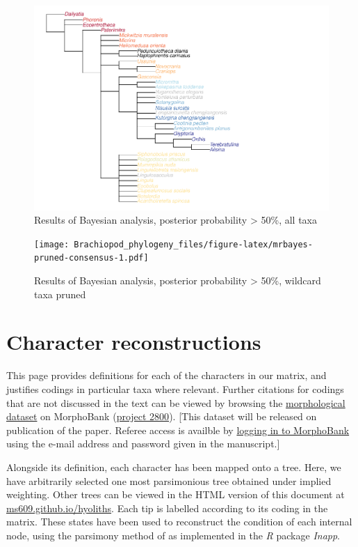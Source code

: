 \documentclass[openany]{book}
\begin{document}
\begin{figure}
\centering
\includegraphics{Brachiopod_phylogeny_files/figure-latex/mrbayes-full-consensus-1.pdf}
\caption{\label{fig:mrbayes-full-consensus}Results of Bayesian analysis,
posterior probability \textgreater{} 50\%, all taxa}
\end{figure}

\begin{figure}
\centering
\texttt{[image: Brachiopod\_phylogeny\_files/figure-latex/mrbayes-pruned-consensus-1.pdf]}
\caption{\label{fig:mrbayes-pruned-consensus}Results of Bayesian analysis,
posterior probability \textgreater{} 50\%, wildcard taxa pruned}
\end{figure}

\hypertarget{reconstructions}{\chapter{Character
reconstructions}\label{reconstructions}}

This page provides definitions for each of the characters in our matrix,
and justifies codings in particular taxa where relevant. Further
citations for codings that are not discussed in the text can be viewed
by browsing the \protect\hyperlink{dataset}{morphological dataset} on
MorphoBank (\href{https://morphobank.org/permalink/?P2800}{project
2800}). {[}This dataset will be released on publication of the paper.
Referee access is availble by
\href{https://morphobank.org/index.php/LoginReg/form}{logging in to
MorphoBank} using the e-mail address and password given in the
manuscript.{]}

Alongside its definition, each character has been mapped onto a tree.
Here, we have arbitrarily selected one most parsimonious tree obtained
under implied weighting. Other trees can be viewed in the HTML version
of this document at
\href{https://ms609.github.io/hyoliths/reconstructions.html}{ms609.github.io/hyoliths}.
Each tip is labelled according to its coding in the matrix. These states
have been used to reconstruct the condition of each internal node, using
the parsimony method of \citet{Brazeau2018} as implemented in the
\emph{R} package \emph{Inapp}.
\end{document}
